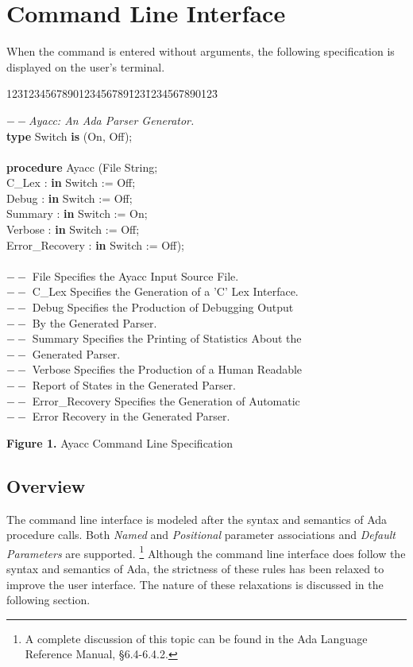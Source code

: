 \section{Command Line Interface}
{\samepage
When the \ayacc command is entered without arguments, the following
specification is displayed on the user's terminal.
\begin{tabbing}
123\=1234567890123456789\=123\=1234567890123\= \kill

\>   $--${\it Ayacc: An Ada Parser Generator.}\\
\>  {\bf type} Switch {\bf is} (On, Off);\\
\\
\>  {\bf procedure} Ayacc (\>File  \>  String;\\
\>\>                      C\_Lex \>\>     : {\bf in} Switch := Off;\\
\>\>                      Debug  \>\>    : {\bf in} Switch := Off;\\
\>\>                      Summary \>\>   : {\bf in} Switch := On;\\
\>\>                      Verbose \>\>   : {\bf in} Switch := Off;\\
\>\>                      Error\_Recovery\>\> :  {\bf in} Switch := Off);\\
\\
\>   $--$ File \>Specifies the Ayacc Input Source File.\\
\>   $--$ C\_Lex\> Specifies the Generation of a 'C' Lex Interface.\\
\>   $--$ Debug\>      Specifies the Production of Debugging Output\\
\>   $--$ \>\>           By the Generated Parser.\\
\>   $--$ Summary\>    Specifies the Printing of Statistics About the\\
\>   $--$\>\>              Generated Parser.\\
\>   $--$ Verbose\>    Specifies the Production of a Human Readable\\
\>   $--$ \>\>             Report of States in the Generated Parser.\\
\>   $--$ Error\_Recovery\>   Specifies the Generation of Automatic\\
\>   $--$ \>\>             Error Recovery in the Generated Parser.
\end{tabbing}
\centerline{{\bf Figure 1.} Ayacc Command Line Specification}
}
\newpage
\subsection{Overview}
The \ayacc command line interface is modeled after the syntax and
semantics of Ada procedure
calls.  Both {\it Named} and {\it Positional} parameter associations and
{\it Default Parameters} are supported.
\footnote{
A complete discussion of this topic can be found in the Ada Language
Reference Manual, \S 6.4-6.4.2.
}
Although the command line 
interface does follow the syntax and semantics of Ada, the
strictness of these rules has been relaxed to improve the user
interface.  The nature of these relaxations is discussed in the
following section.
